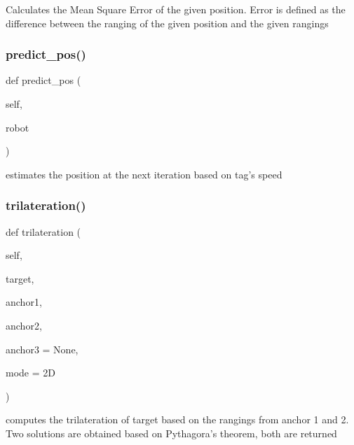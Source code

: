 \begin{DoxyVerb}Calculates the Mean Square Error of the given position.
Error is defined as the difference between the ranging of the given position and the given rangings\end{DoxyVerb}
 \mbox{\label{classworld_1_1_world_a34e56a6b0b7a51cc806cd0648a7ed275}} 
\subsubsection{\texorpdfstring{predict\+\_\+pos()}{predict\_pos()}}
{\footnotesize\ttfamily def predict\+\_\+pos (\begin{DoxyParamCaption}\item[{}]{self,  }\item[{}]{robot }\end{DoxyParamCaption})}

\begin{DoxyVerb}estimates the position at the next iteration based on tag's speed\end{DoxyVerb}
 \mbox{\label{classworld_1_1_world_abd1ed1c4492cfa667fe9fda253df6173}} 
\subsubsection{\texorpdfstring{trilateration()}{trilateration()}}
{\footnotesize\ttfamily def trilateration (\begin{DoxyParamCaption}\item[{}]{self,  }\item[{}]{target,  }\item[{}]{anchor1,  }\item[{}]{anchor2,  }\item[{}]{anchor3 = {\ttfamily None},  }\item[{}]{mode = {\ttfamily \textquotesingle{}2D\textquotesingle{}} }\end{DoxyParamCaption})}

\begin{DoxyVerb}computes the trilateration of target based on the rangings from anchor 1 and 2.
Two solutions are obtained based on Pythagora's theorem, both are returned\end{DoxyVerb}
 \mbox{\label{classworld_1_1_world_a6886efcaba6a255c9d7566ba44f518f9}} 
